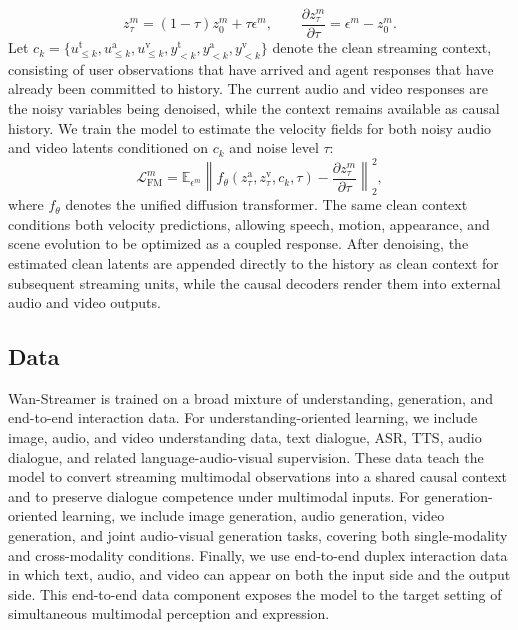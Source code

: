 \documentclass[]{style/style}
\begin{document}
\begin{equation}
\label{eq:flow-path}
    z_\tau^m=(1-\tau)z_0^m+\tau\epsilon^m, \qquad 
    \frac{\partial z_\tau^m}{\partial\tau} = \epsilon^m-z_0^m.
\end{equation}
Let $c_k=\{u_{\le k}^{\mathrm{t}},u_{\le k}^{\mathrm{a}},u_{\le k}^{\mathrm{v}},y_{<k}^{\mathrm{t}},y_{<k}^{\mathrm{a}},y_{<k}^{\mathrm{v}}\}$ denote the clean streaming context, consisting of user observations that have arrived and agent responses that have already been committed to history. The current audio and video responses are the noisy variables being denoised, while the context remains available as causal history. We train the model to estimate the velocity fields for both noisy audio and video latents conditioned on $c_k$ and noise level $\tau$:
\begin{equation}
\label{eq:joint-flow-matching}
    \mathcal L_{\mathrm{FM}}^m =  \mathbb{E}_{\epsilon^m} \left\| f_\theta \!\left(z_\tau^{\mathrm{a}},z_\tau^{\mathrm{v}},c_k,\tau\right) - \frac{\partial z_\tau^m}{\partial\tau} \right\|_2^2 ,
\end{equation}
where $f_\theta$ denotes the unified diffusion transformer. The same clean context conditions both velocity predictions, allowing speech, motion, appearance, and scene evolution to be optimized as a coupled response. After denoising, the estimated clean latents are appended directly to the history as clean context for subsequent streaming units, while the causal decoders render them into external audio and video outputs.



\subsection{Data}
Wan-Streamer is trained on a broad mixture of understanding, generation, and end-to-end interaction data. For understanding-oriented learning, we include image, audio, and video understanding data, text dialogue, ASR, TTS, audio dialogue, and related language-audio-visual supervision. These data teach the model to convert streaming multimodal observations into a shared causal context and to preserve dialogue competence under multimodal inputs. For generation-oriented learning, we include image generation, audio generation, video generation, and joint audio-visual generation tasks, covering both single-modality and cross-modality conditions. Finally, we use end-to-end duplex interaction data in which text, audio, and video can appear on both the input side and the output side. This end-to-end data component exposes the model to the target setting of simultaneous multimodal perception and expression.
\end{document}
